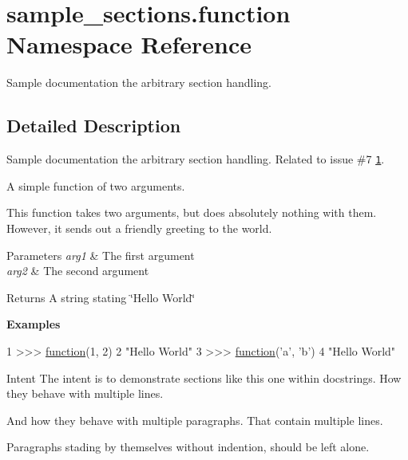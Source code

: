 \hypertarget{namespacesample__sections_1_1function}{\section{sample\-\_\-sections.\-function Namespace Reference}
\label{namespacesample__sections_1_1function}
}


Sample documentation the arbitrary section handling.  




\subsection{Detailed Description}
Sample documentation the arbitrary section handling. Related to issue \#7 \href{https://github.com/Feneric/doxypypy/issues/7}{\tt 1}.

A simple function of two arguments. \begin{DoxyVerb}This function takes two arguments, but does absolutely nothing with them.
However, it sends out a friendly greeting to the world.
\end{DoxyVerb}



\begin{DoxyParams}{Parameters}
{\em arg1} & The first argument \\
\hline
{\em arg2} & The second argument\\
\hline
\end{DoxyParams}
\begin{DoxyReturn}{Returns}
A string stating \char`\"{}\-Hello World\char`\"{}
\end{DoxyReturn}
{\bfseries Examples} 
\begin{DoxyCode}
1 >>> \hyperlink{namespacedoxypypy_1_1test_1_1sample__sections_aca57525d1a888c13df067cbe0a4b183d}{function}(1, 2)
2 \textcolor{stringliteral}{"Hello World"}
3 >>> \hyperlink{namespacedoxypypy_1_1test_1_1sample__sections_aca57525d1a888c13df067cbe0a4b183d}{function}(\textcolor{stringliteral}{'a'}, \textcolor{stringliteral}{'b'})
4 \textcolor{stringliteral}{"Hello World"}
\end{DoxyCode}


\begin{DoxyParagraph}{Intent}
The intent is to demonstrate sections like this one within docstrings. How they behave with multiple lines. 
\end{DoxyParagraph}
\begin{DoxyParagraph}{}
And how they behave with multiple paragraphs. That contain multiple lines.
\end{DoxyParagraph}
Paragraphs stading by themselves without indention, should be left alone.

